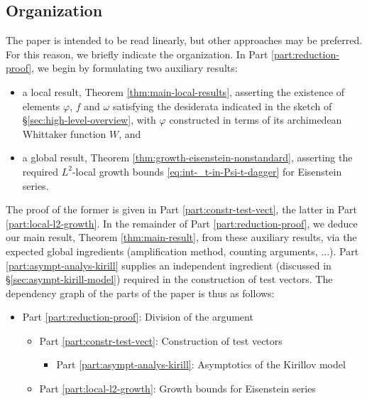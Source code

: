 \subsection{Organization}
The paper is intended to be read linearly, but other approaches may be preferred.  For this reason, we briefly indicate the organization.  In Part \ref{part:reduction-proof}, we begin by formulating two auxiliary results:
\begin{itemize}
\item a local result, Theorem \ref{thm:main-local-results}, asserting the existence of elements $\varphi$, $f$ and $\omega$ satisfying the desiderata indicated in the sketch of \S\ref{sec:high-level-overview}, with $\varphi$ constructed in terms of its archimedean Whittaker function $W$, and
\item a global result, Theorem \ref{thm:growth-eisenstein-nonstandard}, asserting the required $L^2$-local growth bounds \eqref{eq:int-_t-in-Psi-t-dagger} for Eisenstein series.
\end{itemize}
The proof of the former is given in Part \ref{part:constr-test-vect}, the latter in Part \ref{part:local-l2-growth}.  In the remainder of Part \ref{part:reduction-proof}, we deduce our main result, Theorem \ref{thm:main-result}, from these auxiliary results, via the expected global ingredients (amplification method, counting arguments, $\dotsc$).  Part \ref{part:asympt-analys-kirill} supplies an independent ingredient (discussed in \S\ref{sec:asympt-kirill-model}) required in the construction of test vectors.  The dependency graph of the parts of the paper is thus as follows:
\begin{itemize}
\item Part \ref{part:reduction-proof}: Division of the argument
  \begin{itemize}
  \item Part \ref{part:constr-test-vect}: Construction of test vectors
    \begin{itemize}
    \item Part \ref{part:asympt-analys-kirill}: Asymptotics of the Kirillov model
    \end{itemize}
  \item Part \ref{part:local-l2-growth}: Growth bounds for Eisenstein series
  \end{itemize}
\end{itemize}


